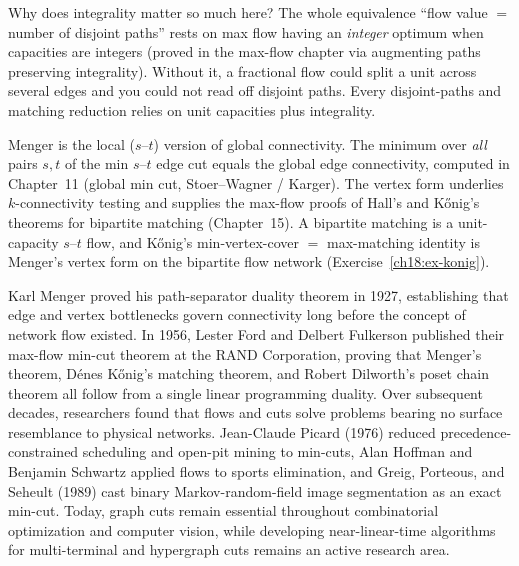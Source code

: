 \begin{whybox}
Why does integrality matter so much here? The whole equivalence ``flow value $=$ number of disjoint paths'' rests on max flow having an \emph{integer} optimum when capacities are integers (proved in the max-flow chapter via augmenting paths preserving integrality). Without it, a fractional flow could split a unit across several edges and you could not read off disjoint paths. Every disjoint-paths and matching reduction relies on unit capacities plus integrality.
\end{whybox}

\begin{connectionbox}
Menger is the local ($s$--$t$) version of global connectivity. The minimum over \emph{all} pairs $s,t$ of the min $s$--$t$ edge cut equals the global edge connectivity, computed in Chapter~11 (global min cut, Stoer--Wagner / Karger). The vertex form underlies $k$-connectivity testing and supplies the max-flow proofs of Hall's and K\H{o}nig's theorems for bipartite matching (Chapter~15). A bipartite matching is a unit-capacity $s$--$t$ flow, and K\H{o}nig's min-vertex-cover $=$ max-matching identity is Menger's vertex form on the bipartite flow network (Exercise~\ref{ch18:ex-konig}).
\end{connectionbox}

\begin{historybox}
Karl Menger proved his path-separator duality theorem in 1927, establishing that edge and vertex bottlenecks govern connectivity long before the concept of network flow existed. In 1956, Lester Ford and Delbert Fulkerson published their max-flow min-cut theorem at the RAND Corporation, proving that Menger's theorem, D\'enes K\H{o}nig's matching theorem, and Robert Dilworth's poset chain theorem all follow from a single linear programming duality. Over subsequent decades, researchers found that flows and cuts solve problems bearing no surface resemblance to physical networks. Jean-Claude Picard (1976) reduced precedence-constrained scheduling and open-pit mining to min-cuts, Alan Hoffman and Benjamin Schwartz applied flows to sports elimination, and Greig, Porteous, and Seheult (1989) cast binary Markov-random-field image segmentation as an exact min-cut. Today, graph cuts remain essential throughout combinatorial optimization and computer vision, while developing near-linear-time algorithms for multi-terminal and hypergraph cuts remains an active research area.
\end{historybox}

